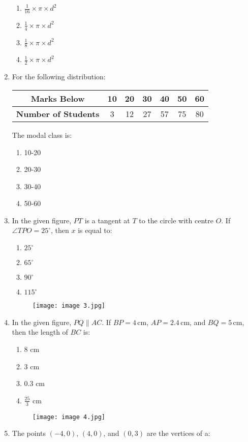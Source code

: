 \documentclass{article}
\begin{document}
\begin{enumerate}
\begin{enumerate}
    \item \(\frac{1}{16} \times \pi \times d^2\)
    \item \(\frac{1}{4} \times \pi \times d^2\)
    \item \(\frac{1}{8} \times \pi \times d^2\)
    \item \(\frac{1}{2} \times \pi \times d^2\)
\end{enumerate}
\item For the following distribution:

\begin{center}
\begin{tabular}{|c|c|c|c|c|c|c|}
\hline
\textbf{Marks Below} & 10 & 20 & 30 & 40 & 50 & 60 \\
\hline
\textbf{Number of Students} & 3 & 12 & 27 & 57 & 75 & 80 \\
\hline
\end{tabular}
\end{center}

The modal class is:

\begin{enumerate}
    \item 10-20
    \item 20-30
    \item 30-40
    \item 50-60
\end{enumerate}
\item In the given figure, \(PT\) is a tangent at \(T\) to the circle with centre \(O\). If \(\angle TPO = 25^\circ\), then \(x\) is equal to:

\begin{enumerate}
    \item \(25^\circ\)
    \item \(65^\circ\)
    \item \(90^\circ\)
    \item \(115^\circ\)
\end{enumerate}
\begin{figure}[h!]
\centering
\texttt{[image: image 3.jpg]}
\label{fig:image1}
\end{figure}
\item In the given figure, \(PQ \parallel AC\). If \(BP = 4 \, \text{cm}\), \(AP = 2.4 \, \text{cm}\), and \(BQ = 5 \, \text{cm}\), then the length of \(BC\) is:

	\begin{enumerate}
    \item 8 cm
    \item 3 cm
    \item 0.3 cm
    \item \(\frac{25}{3}\) cm
\end{enumerate}
\begin{figure}[h!]
\centering
\texttt{[image: image 4.jpg]}
\label{fig:image1}
\end{figure}
\item The points \((-4,0)\), \((4,0)\), and \((0,3)\) are the vertices of a:


\end{enumerate}
\end{document}
